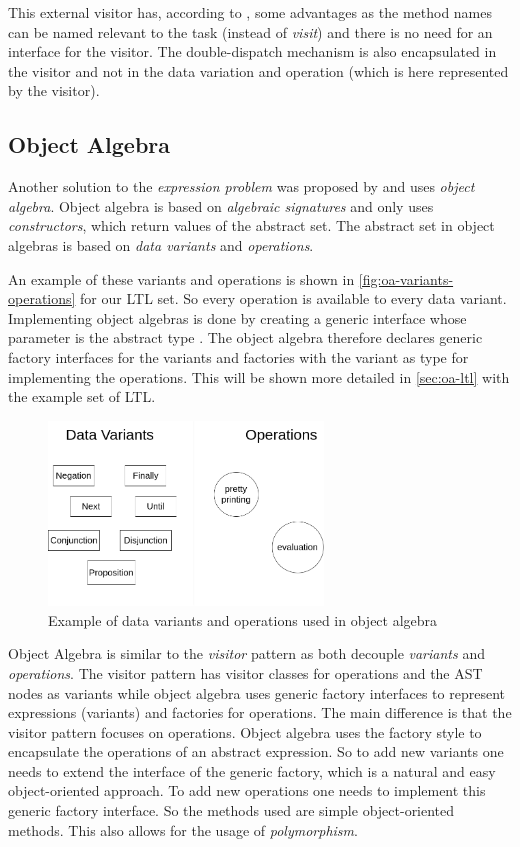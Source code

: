 \documentclass{llncs}
\begin{document}
This external visitor has, according to \cite{Parr09}, some advantages as the method names can be named relevant to the task (instead of \emph{visit}) and there is no need for an interface for the visitor. The double-dispatch mechanism is also encapsulated in the visitor and not in the data variation and operation (which is here represented by the visitor). 


\subsection{Object Algebra} \label{ssec:oa}
Another solution to the \emph{expression problem} was proposed by \cite{Oliveira12} and uses \emph{object algebra}. Object algebra is based on \emph{algebraic signatures} \cite{Guttag78} and only uses \emph{constructors}, which return values of the abstract set. The abstract set in object algebras is based on \emph{data variants} and \emph{operations}. 

An example of these variants and operations is shown in \autoref{fig:oa-variants-operations} for our LTL set. So every operation is available to every data variant. Implementing object algebras is done by creating a generic interface whose parameter is the abstract type \cite{Oliveira12}. The object algebra therefore declares generic factory interfaces for the variants and factories with the variant as type for implementing the operations. This will be shown more detailed in \autoref{sec:oa-ltl} with the example set of LTL.

\begin{figure}[h]
	\centering
	\includegraphics[width=0.65\textwidth]{img/OA-Variants-Operations}
	\caption{Example of data variants and operations used in object algebra}
	\label{fig:oa-variants-operations}
\end{figure} 

Object Algebra is similar to the \emph{visitor} pattern as both decouple \emph{variants} and \emph{operations}. The visitor pattern has visitor classes for operations and the AST nodes as variants while object algebra uses generic factory interfaces to represent expressions (variants) and factories for operations. The main difference is that the visitor pattern focuses on operations. Object algebra uses the factory style to encapsulate the operations of an abstract expression. So to add new variants one needs to extend the interface of the generic factory, which is a natural and easy object-oriented approach. To add new operations one needs to implement this generic factory interface. So the methods used are simple object-oriented methods. This also allows for the usage of \emph{polymorphism}.
\end{document}
